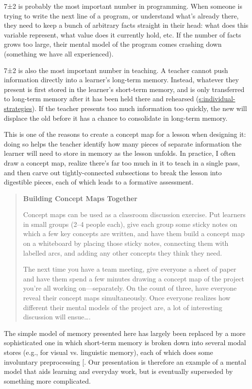 7±2 is probably the most important number in programming. When
someone is trying to write the next line of a program, or understand
what's already there, they need to keep a bunch of arbitrary facts
straight in their head: what does this variable represent, what value
does it currently hold, etc. If the number of facts grows too large,
their mental model of the program comes crashing down (something we have
all experienced).

7±2 is also the most important number in teaching. A teacher cannot
push information directly into a learner's long-term memory. Instead,
whatever they present is first stored in the learner's short-term
memory, and is only transferred to long-term memory after it has been
held there and rehearsed (\protect\hyperlink{SECTION}{s:individual-strategies}). If the
teacher presents too much information too quickly, the new will
displace the old before it has a chance to consolidate in long-term
memory.

This is one of the reasons to create a concept map for a lesson when
designing it: doing so helps the teacher identify how many pieces of
separate information the learner will need to store in memory as the
lesson unfolds. In practice, I often draw a concept map, realize there's
far too much in it to teach in a single pass, and then carve out
tightly-connected subsections to break the lesson into digestible
pieces, each of which leads to a formative assessment.

\begin{quote}\setlength{\parindent}{0pt}
\textbf{Building Concept Maps Together}

Concept maps can be used as a classroom discussion exercise. Put
learners in small groups (2--4 people each), give each group some
sticky notes on which a few key concepts are written, and have them
build a concept map on a whiteboard by placing those sticky notes,
connecting them with labelled arcs, and adding any other concepts they
think they need.

The next time you have a team meeting, give everyone a sheet of paper
and have them spend a few minutes drawing a concept map of the project
you're all working on---separately. On the count of three, have everyone
reveal their concept maps simultaneously. Once everyone realizes how
different their mental models of the project are, a lot of interesting
discussion will ensue\ldots{}.
\end{quote}

The simple model of memory presented here has largely been replaced by a
more sophisticated one in which short-term memory is broken down into
several modal stores (e.g., for visual vs. linguistic memory), each of
which does some involuntary preprocessing {[}\protect[\hyperlink{b:Mill2016a}{Mill2016a}]{]}. Our
presentation is therefore an example of a mental model that aids
learning and everyday work, but is eventually superseded by something
more complicated.

